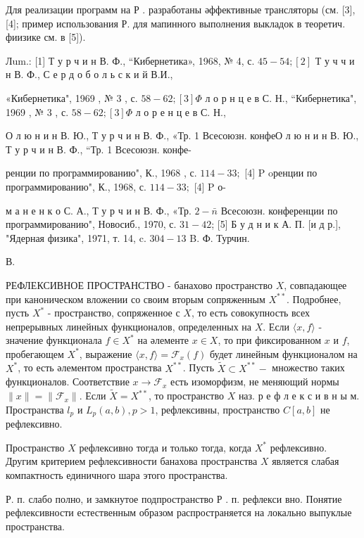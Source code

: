 \documentclass[10pt]{article}
\begin{document}
Для реализации программ на Р . разработаны әффективные трансляторы (см. [3], [4]; пример использования Р. для мапинного выполнения выкладок в теоретич. фиизике см. в [5]).



Лum.: [1] Т у р ч и н В. Ф., “Кибернетика», 1968, № 4, с. $45-54 ;[2]$ Т у ч ч и н В. Ф., С е р д о б о л ь с к и й В.И.,

«Кибернетика", 1969 , № 3 , с. $58-62 ;[3] \Phi$ л о р н ц е в С. Н., “Кибернетика", 1969 , № 3 , с. $58-62 ;[3] \Phi$ л о р е н ц е в С. Н.,

О л ю н и н В. Ю., Т у р ч и н В. Ф., «Тр. 1 Всесоюзн. конфеО л ю н и н В. Ю., Т у р ч и н В. Ф., “Тр. 1 Всесоюзн. конфе-

ренции по программированию", К., 1968 , с. $114-33 ;$ [4] P oренции по программированию", К., 1968, с. $114-33 ;$ [4] P о-

м а н е н к о С. А., Т у р ч и н В. Ф., «Тр. $2-\bar{n}$ Всесоюзн. конференции по программированию", Новосиб., 1970, с. $31-42$; [5] Б у д н и к А. П. [и д р.], "Ядерная физика", 1971, т. 14, c. $304-13$ B. Ф. Турчин.

В.



РЕФЛЕКСИВНОЕ ПРОСТРАНСТВО - банахово пространство $X$, совпадающее при каноническом вложении со своим вторым сопряженным $X^{* *}$. Подробнее, пусть $X^{*}$ - пространство, сопряженное с $X$, то есть совокупность всех непрерывных линейных функционалов, определенных на $X$. Если $\langle x, f\rangle$ - значение функционала $f \in X^{*}$ на әлементе $x \in X$, то при фиксированном $x$ и $f$, пробегающем $X^{*}$, выражение $\langle x, f\rangle=\mathscr{F}_{x}(f)$ будет линейным функционалом на $X^{*}$, то есть әлементом пространства $X^{* *}$. Пусть $\tilde{X} \subset X^{* *}-$ множество таких функционалов. Соответствие $x \rightarrow \mathscr{F}_{x}$ есть изоморфизм, не меняющий нормы $\|x\|=\left\|\mathcal{F}_{x}\right\|$. Если $\tilde{X}=X^{* *}$, то пространство $X$ наз. р е ф л е к с и в н ы м. Пространства $l_{p}$ и $L_{p}(a, b), p>1$, рефлексивны, пространство $C[a, b]$ не рефлексивно.



Пространство $X$ рефлексивно тогда и только тогда, когда $X^{*}$ рефлексивно. Другим критерием рефлексивности банахова пространства $X$ является слабая компактность единичного шара этого пространства.



Р. п. слабо полно, и замкнутое подпространство Р . п. рефлекси вно. Понятие рефлексивности естественным образом распространяется на локально выпуклые пространства.
\end{document}
